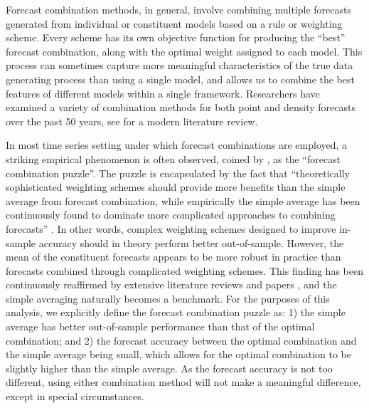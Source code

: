 \documentclass{monashthesis}
\begin{document}
Forecast combination methods, in general, involve combining multiple forecasts generated from individual or constituent models based on a rule or weighting scheme. Every scheme has its own objective function for producing the ``best'' forecast combination, along with the optimal weight assigned to each model. This process can sometimes capture more meaningful characteristics of the true data generating process than using a single model, and allows us to combine the best features of different models within a single framework. Researchers have examined a variety of combination methods for both point and density forecasts over the past 50 years, see \textcite{WHLK22} for a modern literature review.

In most time series setting under which forecast combinations are employed, a striking empirical phenomenon is often observed, coined by \textcite{SW04}, as the ``forecast combination puzzle''. The puzzle is encapsulated by the fact that ``theoretically sophisticated weighting schemes should provide more benefits than the simple average from forecast combination, while empirically the simple average has been continuously found to dominate more complicated approaches to combining forecasts'' \autocite{WHLK22}. In other words, complex weighting schemes designed to improve in-sample accuracy should in theory perform better out-of-sample. However, the mean of the constituent forecasts appears to be more robust in practice than forecasts combined through complicated weighting schemes. This finding has been continuously reaffirmed by extensive literature reviews and papers \autocites[e.g.,][]{MACF82,C89,MSA18,MSA20}, and the simple averaging naturally becomes a benchmark. For the purposes of this analysis, we explicitly define the forecast combination puzzle as: 1) the simple average has better out-of-sample performance than that of the optimal combination; and 2) the forecast accuracy between the optimal combination and the simple average being small, which allows for the optimal combination to be slightly higher than the simple average. As the forecast accuracy is not too different, using either combination method will not make a meaningful difference, except in special circumstances.
\end{document}
